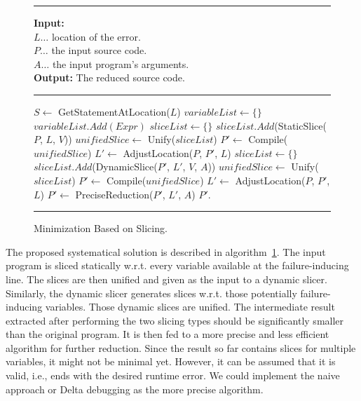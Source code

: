 \begin{figure}[h]
	\hrule height.8pt depth0pt \kern2pt
	\textbf{Input:} \\
	\hspace*{\algorithmicindent} $L \ldots$ location of the error. \\
	\hspace*{\algorithmicindent} $P \ldots$ the input source code. \\
	\hspace*{\algorithmicindent} $A \ldots$ the input program's arguments. \\
	\textbf{Output:} The reduced source code. 
	\hrule height.8pt depth0pt \kern2pt
	\begin{algorithmic}[1]
		\State $S \leftarrow$ GetStatementAtLocation($L$)
		\State $variableList \leftarrow \{\}$
				\State $variableList.Add(Expr)$
			\EndIf
		\EndFor
		\State $sliceList \leftarrow \{\}$
			\State $sliceList.Add$(StaticSlice($P$, $L$, $V$))
		\EndFor
		\State $unifiedSlice \leftarrow$ Unify($sliceList$)
		\State $P' \leftarrow$ Compile($unifiedSlice$)
		\State $L' \leftarrow$ AdjustLocation($P$, $P'$, $L$)
		\State $sliceList \leftarrow \{\}$
			\State $sliceList.Add$(DynamicSlice($P'$, $L'$, $V$, $A$))
		\EndFor
		\State $unifiedSlice \leftarrow$ Unify($sliceList$)
		\State $P' \leftarrow$ Compile($unifiedSlice$)
		\State $L' \leftarrow$ AdjustLocation($P$, $P'$, $L$)
		\State $P' \leftarrow$ PreciseReduction($P'$, $L'$, $A$)
		\State \Return $P'$.
	\end{algorithmic} 
	\hrule height.8pt depth0pt \kern2pt
	\caption{Minimization Based on Slicing.} 
	\label{alg:slicing}
\end{figure}

The proposed systematical solution is described in algorithm~\ref{alg:slicing}.
The input program is sliced statically w.r.t.
every variable available at the failure-inducing line.
The slices are then unified and given as the input to a dynamic slicer.
Similarly, the dynamic slicer generates slices w.r.t.
those potentially failure-inducing variables.
Those dynamic slices are unified.
The intermediate result extracted after performing the two slicing types 
should be significantly smaller than the original program.
It is then fed to a more precise and less efficient algorithm for further 
reduction.
Since the result so far contains slices for multiple variables, it might not 
be minimal yet.
However, it can be assumed that it is valid, i.e., ends with the desired 
runtime error.
We could implement the naive approach or Delta debugging as the more 
precise algorithm.

